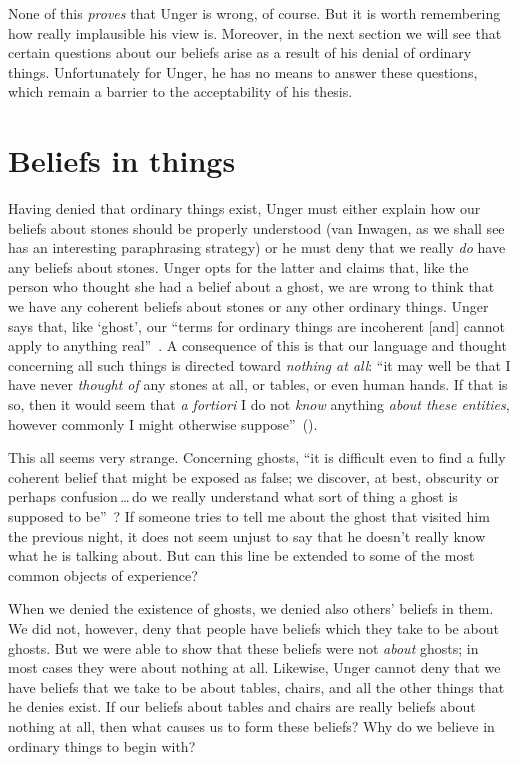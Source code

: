 \documentclass[11pt]{standalone} \newif\ifstandlone \standalonetrue
\begin{document}
\begin{spacing}{1.5}
None of this {\em proves} that Unger is wrong, of course.  But it is
worth remembering how really implausible his view is.  Moreover, in
the next section we will see that certain questions about our beliefs
arise as a result of his denial of ordinary things.  Unfortunately for
Unger, he has no means to answer these questions, which remain a
barrier to the acceptability of his thesis.

\section{Beliefs in things}
Having denied that ordinary things exist, Unger must either explain
how our beliefs about stones should be properly understood (van
Inwagen, as we shall see has an interesting paraphrasing strategy) or
he must deny that we really {\em do} have any beliefs about stones.
Unger opts for the latter and claims that, like the person who thought
she had a belief about a ghost, we are wrong to think that we have
any coherent beliefs about stones or any other ordinary things.  Unger
says that, like `ghost', our ``terms for ordinary things are
incoherent [and] cannot apply to anything
real''~\citep[147]{unger1979}.  A consequence of this is that our
language and thought concerning all such things is directed toward
{\em nothing at all}: ``it may well be that I have never {\em thought
  of} any stones at all, or tables, or even human hands.  If that is
so, then it would seem that {\em a fortiori} I do not {\em know}
anything {\em about these entities}, however commonly I might
otherwise suppose''~(\citeyear[458]{unger1980a}).

This all seems very strange.  Concerning ghosts, ``it is difficult
even to find a fully coherent belief that might be exposed as false;
we discover, at best, obscurity or perhaps confusion\,\ldots\,do we
really understand what sort of thing a ghost is supposed to
be''~\citep[76]{stroud2000a}?  If someone tries to tell me about the
ghost that visited him the previous night, it does not seem unjust to
say that he doesn't really know what he is talking about.  But can
this line be extended to some of the most common objects of
experience?

When we denied the existence of ghosts, we denied also others' beliefs
in them.  We did not, however, deny that people have beliefs which
they take to be about ghosts.  But we were able to show that these
beliefs were not {\em about} ghosts; in most cases they were about
nothing at all.  Likewise, Unger cannot deny that we have beliefs that
we take to be about tables, chairs, and all the other things that he
denies exist.  If our beliefs about tables and chairs are really
beliefs about nothing at all, then what causes us to form these
beliefs?  Why do we believe in ordinary things to begin with?


\end{spacing}
\end{document}
